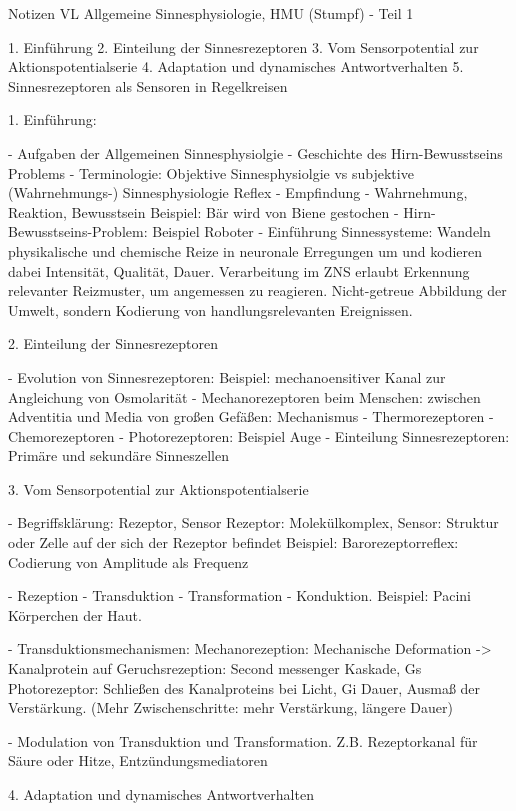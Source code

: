 


Notizen VL Allgemeine Sinnesphysiologie, HMU (Stumpf) - Teil 1

1. Einführung
2. Einteilung der Sinnesrezeptoren
3. Vom Sensorpotential zur Aktionspotentialserie
4. Adaptation und dynamisches Antwortverhalten
5. Sinnesrezeptoren als Sensoren in Regelkreisen


1. Einführung: 

- Aufgaben der Allgemeinen Sinnesphysiolgie
- Geschichte des Hirn-Bewusstseins Problems
- Terminologie: Objektive Sinnesphysiolgie vs subjektive (Wahrnehmungs-) Sinnesphysiologie
    Reflex - Empfindung - Wahrnehmung, Reaktion, Bewusstsein
    Beispiel: Bär wird von Biene gestochen
- Hirn-Bewusstseins-Problem: Beispiel Roboter
- Einführung Sinnessysteme: 
    Wandeln physikalische und chemische Reize in neuronale Erregungen um und kodieren dabei Intensität, Qualität, Dauer. 
    Verarbeitung im ZNS erlaubt Erkennung relevanter Reizmuster, um angemessen zu reagieren. 
    Nicht-getreue Abbildung der Umwelt, sondern Kodierung von handlungsrelevanten Ereignissen. 
  
    
2. Einteilung der Sinnesrezeptoren

- Evolution von Sinnesrezeptoren: 
    Beispiel: mechanoensitiver Kanal zur Angleichung von Osmolarität
- Mechanorezeptoren beim Menschen: zwischen Adventitia und Media von großen Gefäßen: Mechanismus
- Thermorezeptoren
- Chemorezeptoren
- Photorezeptoren: Beispiel Auge
- Einteilung Sinnesrezeptoren: Primäre und sekundäre Sinneszellen

3. Vom Sensorpotential zur Aktionspotentialserie

- Begriffsklärung: Rezeptor, Sensor
    Rezeptor: Molekülkomplex, Sensor: Struktur oder Zelle auf der sich der Rezeptor befindet
    Beispiel: Barorezeptorreflex: Codierung von Amplitude als Frequenz

- Rezeption - Transduktion - Transformation - Konduktion. Beispiel: Pacini Körperchen der Haut. 

- Transduktionsmechanismen:
    Mechanorezeption: Mechanische Deformation -> Kanalprotein auf
    Geruchsrezeption: Second messenger Kaskade, Gs
    Photorezeptor: Schließen des Kanalproteins bei Licht, Gi
    Dauer, Ausmaß der Verstärkung. (Mehr Zwischenschritte: mehr Verstärkung, längere Dauer)
    
- Modulation von Transduktion und Transformation. Z.B. Rezeptorkanal für Säure oder Hitze, Entzündungsmediatoren

4. Adaptation und dynamisches Antwortverhalten


